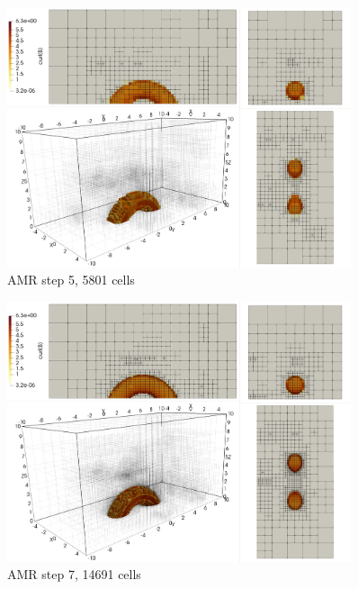 \begin{figure}[H]
	\centering
	\includegraphics[width=0.9\textwidth]{img/td/td2.jpg}
\vspace{-2mm}
\caption{AMR step 5, 5801 cells}
\label{figure:myTd2}
\end{figure}
\vspace{-2mm}

\begin{figure}[H]
	\centering
	\includegraphics[width=0.9\textwidth]{img/td/td3.jpg}
\vspace{-2mm}
\caption{AMR step 7, 14691 cells}
\label{figure:myTd3}
\end{figure}
\vspace{-2mm}

